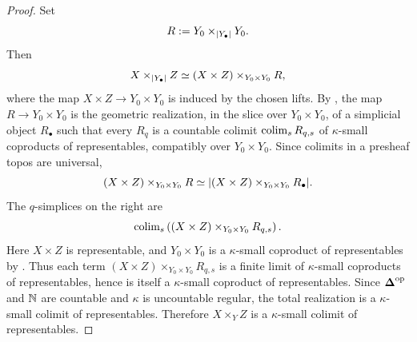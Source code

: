 \documentclass[11pt]{book}
\begin{document}
\begin{proof}
		Set
		\[
			R := Y_0 \times_{\lvert Y_{\bullet} \rvert} Y_0.
		\]
		Then
		\[
			X \times_{\lvert Y_{\bullet} \rvert} Z
			\simeq
			(X \times Z) \times_{Y_0 \times Y_0} R,
		\]
		where the map $X\times Z\to Y_0\times Y_0$ is induced by the chosen
		lifts. By , the map
		$R\to Y_0\times Y_0$ is the geometric realization, in the slice over
		$Y_0\times Y_0$, of a simplicial object $R_{\bullet}$ such that every
		$R_q$ is a countable colimit $\operatorname{colim}_s R_{q,s}$ of $\kappa$-small
		coproducts of representables, compatibly over $Y_0\times Y_0$. Since
		colimits in a presheaf topos are universal,
		\[
			(X \times Z) \times_{Y_0 \times Y_0} R
			\simeq
			\lvert (X \times Z) \times_{Y_0 \times Y_0} R_{\bullet} \rvert.
		\]
		The $q$-simplices on the right are
		\[
			\operatorname{colim}_s
			\left((X \times Z)\times_{Y_0\times Y_0}R_{q,s}\right).
		\]
		Here $X\times Z$ is representable, and $Y_0\times Y_0$ is a
		$\kappa$-small coproduct of representables by
		. Thus each
		term $(X \times Z)\times_{Y_0\times Y_0}R_{q,s}$ is a finite limit of
		$\kappa$-small coproducts of representables, hence is itself a
		$\kappa$-small coproduct of representables. Since $\simp\catop$ and
		$\operatorname{\mathbb N}$ are countable and $\kappa$ is uncountable regular, the total
		realization is a $\kappa$-small colimit of representables. Therefore
		$X\times_Y Z$ is a $\kappa$-small colimit of representables.
	\end{proof}
\end{document}
